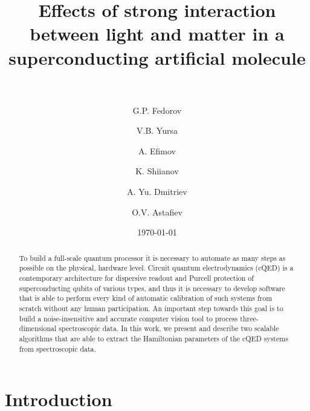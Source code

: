 \documentclass[%
 aip,
 amsmath,amssymb,
 reprint,%
]{revtex4-1}
\newcommand{\mytitile}{Effects of strong interaction between light and matter in a superconducting artificial molecule}
\begin{document}
	
	\title[\mytitile]{\mytitile\\~}
	
	\author{G.P. Fedorov}
	
	
	\author{V.B. Yursa}
	
	\author{A. Efimov}
	
	
	\author{K. Shiianov}


	\author{A. Yu. Dmitriev}

	\author{O.V. Astafiev}
	
	
	\date{\today}%
	
	
	\begin{abstract}
		To build a full-scale quantum processor it is necessary to automate as many steps as possible on the physical, hardware level. Circuit quantum electrodynamics (cQED) is a contemporary architecture for dispersive readout and Purcell protection of superconducting qubits of various types, and thus it is necessary to develop software that is able to perform every kind of automatic calibration of such systems from scratch without any human participation. An important step towards this goal is to build a noise-insensitive and accurate computer vision tool to process three-dimensional spectroscopic data. In this work, we present and describe two scalable algorithms that are able to extract the Hamiltonian parameters of the cQED systems from spectroscopic data. 
	\end{abstract}
	
	\maketitle
\section{Introduction}
\end{document}

